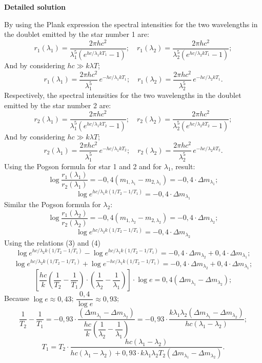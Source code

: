 \textbf{Detailed solution}

By using the Plank expression the spectral intensities for the two wavelengths
in the doublet emitted by the star number 1 are:
\[ r_1(\lambda_1) = \frac{2\pi h c^2}
     {\lambda_1^5\left(e^{hc/\lambda_1 k T_1}-1\right)};\quad
   r_1(\lambda_2) = \frac{2\pi h c^2}
     {\lambda_2^5\left(e^{hc/\lambda_2 k T_1}-1\right)}; \]
And by considering $hc \gg k\lambda T$;
\[ r_1(\lambda_1) = \frac{2\pi h c^2}{\lambda_1^5}\,
     e^{-hc/\lambda_1 k T_1};\quad
   r_1(\lambda_2) = \frac{2\pi h c^2}{\lambda_2^5}\,
     e^{-hc/\lambda_2 k T_1}. \tag*{(1)} \]
Respectively, the spectral intensities for the two wavelengths in the doublet
emitted by the star number 2 are:
\[ r_2(\lambda_1) = \frac{2\pi h c^2}
     {\lambda_1^5\left(e^{hc/\lambda_1 k T_2}-1\right)};\quad
   r_2(\lambda_2) = \frac{2\pi h c^2}
     {\lambda_2^5\left(e^{hc/\lambda_2 k T_2}-1\right)}; \]
And by considering $hc \gg k\lambda T$;
\[ r_2(\lambda_1) = \frac{2\pi h c^2}{\lambda_1^5}\,
     e^{-hc/\lambda_1 k T_2};\quad
   r_2(\lambda_2) = \frac{2\pi h c^2}{\lambda_2^5}\,
     e^{-hc/\lambda_2 k T_2}. \tag*{(2)} \]
Using the Pogson formula for star 1 and 2 and for $\lambda_1$, result:
\[ \log\frac{r_1(\lambda_1)}{r_2(\lambda_1)}
   = -0{,}4\left(m_{1,\lambda_1}-m_{2,\lambda_1}\right)
   = -0{,}4\cdot\Delta m_{\lambda_1}; \]
\[ \log e^{hc/\lambda_1 k\left(1/T_2-1/T_1\right)}
   = -0{,}4\cdot\Delta m_{\lambda_1} \tag*{(3)} \]
Similar the Pogson formula for $\lambda_2$:
\[ \log\frac{r_1(\lambda_2)}{r_2(\lambda_2)}
   = -0{,}4\left(m_{1,\lambda_2}-m_{2,\lambda_2}\right)
   = -0{,}4\cdot\Delta m_{\lambda_2}; \]
\[ \log e^{hc/\lambda_2 k\left(1/T_2-1/T_1\right)}
   = -0{,}4\cdot\Delta m_{\lambda_2} \tag*{(4)} \]
Using the relations (3) and (4)
\[ \log e^{hc/\lambda_2 k\left(1/T_2-1/T_1\right)}
   - \log e^{hc/\lambda_1 k\left(1/T_2-1/T_1\right)}
   = -0{,}4\cdot\Delta m_{\lambda_2} + 0{,}4\cdot\Delta m_{\lambda_1}; \]
\[ \log e^{hc/\lambda_2 k\left(1/T_2-1/T_1\right)}
   + \log e^{-hc/\lambda_1 k\left(1/T_2-1/T_1\right)}
   = -0{,}4\cdot\Delta m_{\lambda_2} + 0{,}4\cdot\Delta m_{\lambda_1}; \]
\[ \left[\frac{hc}{k}\left(\frac{1}{T_2}-\frac{1}{T_1}\right)\cdot
   \left(\frac{1}{\lambda_2}-\frac{1}{\lambda_1}\right)\right]\cdot\log e
   = 0{,}4\left(\Delta m_{\lambda_1}-\Delta m_{\lambda_2}\right); \]
Because $\log e \approx 0{,}43$;
$\dfrac{0{,}4}{\log e}\approx 0{,}93$;
\[ \frac{1}{T_2}-\frac{1}{T_1}
   = -0{,}93\cdot\frac{\left(\Delta m_{\lambda_1}-\Delta m_{\lambda_2}\right)}
     {\dfrac{hc}{k}\left(\dfrac{1}{\lambda_2}-\dfrac{1}{\lambda_1}\right)}
   = -0{,}93\cdot\frac{k\lambda_1\lambda_2
       \left(\Delta m_{\lambda_1}-\Delta m_{\lambda_2}\right)}
     {hc\left(\lambda_1-\lambda_2\right)}; \]
\[ T_1 = T_2\cdot\frac{hc\left(\lambda_1-\lambda_2\right)}
     {hc\left(\lambda_1-\lambda_2\right)
      + 0{,}93\cdot k\lambda_1\lambda_2 T_2
        \left(\Delta m_{\lambda_1}-\Delta m_{\lambda_2}\right)}. \tag*{(5)} \]
